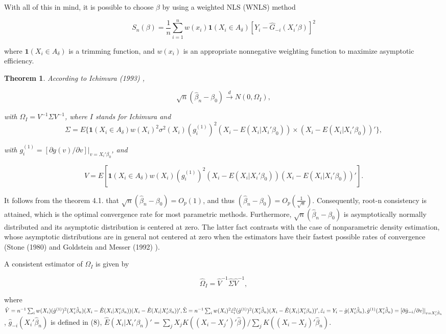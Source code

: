 \documentclass[a4paper]{article}
\begin{document}
With all of this in mind, it is possible to choose $\beta$ by using a weighted NLS (WNLS) method

\begin{equation}
S_n(\beta) = \frac{1}{n} \sum_{i=1}^{n}  w(x_i)\mathbf{1}{(X_i \in A_\delta)[Y_i - \hat{G}_{-i}(X_i'\beta)]^2}
\end{equation}

where $\mathbf{1}{(X_i \in A_\delta)}$ is a trimming function, and $w(x_i)$ is an appropriate nonnegative weighting function to maximize asymptotic efficiency.

\newtheorem{theorem}{Theorem}[section]

\begin{theorem}
According to Ichimura (1993) \cite{[6]}, 

\[ \sqrt{n}(\hat{\beta}_n - \beta_0) \stackrel{d}{\rightarrow} N(0,\Omega_I), \] 

 with $\Omega_I = V^{-1}\Sigma V^{-1}$, where $I$ stands for Ichimura and 
\[\Sigma = E\{\mathbf{1}{(X_i \in A_\delta)}w(X_i)^2\sigma^2(X_i)(g_i^{(1)})^2(X_i - E(X_i|X_i'\beta_0)) \times (X_i - E(X_i|X_i'\beta_0))'\},\]

with $g_i^{(1)} = [\partial g(v)/\partial v]|_{v = X_i'\beta_0}$, and

\[ V = E[ \mathbf{1}{(X_i \in A_\delta)} w(X_i)(g_i^{(1)})^2(X_i - E(X_i|X_i'\beta_0))(X_i - E(X_i|X_i'\beta_0))'].\]

\end{theorem}

It follows from the theorem 4.1. that $\sqrt{n}(\hat{\beta}_n - \beta_0)=O_p(1)$, and thus $(\hat{\beta}_n - \beta_0) = O_p\left(\frac{1}{\sqrt{n}}\right)$. Consequently, root-n consistency is attained, which is the optimal convergence rate for most parametric methods. Furthermore, $\sqrt{n}(\hat{\beta}_n - \beta_0)$ is asymptotically normally distributed and its asymptotic distribution is centered at zero. The latter fact contrasts with the case of nonparametric density estimation, whose asymptotic distributions are in general not centered at zero when the estimators have their fastest possible rates of convergence (Stone (1980) \cite{[15]} and Goldstein and Messer (1992) \cite{[16]}). 


A consistent estimator of $\Omega_I$ is given by

\[ \hat{\Omega}_I = \hat{V}^{-1}\hat{\Sigma}\hat{V}^{-1}, \]

where $\hat{V} = n^{-1}\sum_{i} w(X_i)(\hat{g}^{(1)})^2(X_i'\hat{\beta}_n)(X_i - \hat{E}(X_i|X_i'\beta_n))(X_i - \hat{E}(X_i|X_i'\beta_n))', \hat{\Sigma} = n^{-1}\sum_{i} w(X_i)^2\hat{\varepsilon}_{i}^{2}(\hat{g}^{(1)})^2(X_i'\hat{\beta}_n)(X_i - \hat{E}(X_i|X_i'\beta_n))', \hat{\varepsilon}_i = Y_i - \hat{g}(X_i'\hat{\beta}_n), \hat{g}^{(1)}(X_i'\hat{\beta}_n) \linebreak
= [\partial \hat{g}_{-i}/\partial v]|_{v = X_i'\hat{\beta}_n}$, $\hat{g}_{-i}(X_i'\hat{\beta}_n)$ is defined in (8), $\hat{E}(X_i|X_i'\beta_n)' = \sum_{j} X_jK((X_i - X_j')'\hat{\beta})/ \sum_{j}K((X_i - X_j)'\hat{\beta}_n).$
\end{document}
